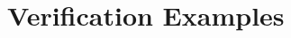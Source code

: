 \documentclass{llncs}
\newcommand{\llbrace}{\hspace{1pt} \lbrace \kern -3pt \vert \hspace{1pt}}
\newcommand{\rrbrace}{\hspace{0.5pt} \rbrace \kern -5pt \vert \hspace{3pt}}
\begin{document}

\section{Verification Examples}
\end{document}
